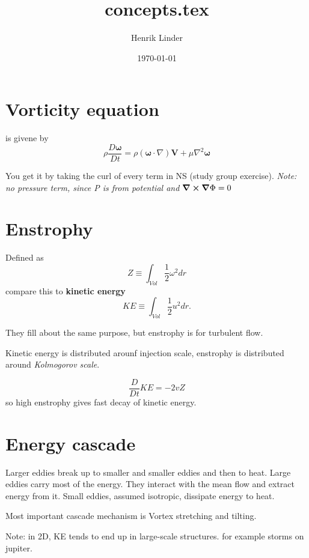 \documentclass{article}
\title{concepts.tex }
\author{Henrik Linder}
\date{\today}
\let\vec\mathbf
\begin{document}
\maketitle
\section{Vorticity equation}
is givene by 
\begin{equation}
	\rho \frac{D\vec \omega}{Dt} = \rho(\vec\omega \cdot \nabla)\vec V + \mu \nabla ^{2}\vec \omega
\end{equation}

You get it by taking the curl of every term in NS (study group exercise). \textit{Note: no pressure term, since P is from potential and $\curl\grad \Phi = 0$}




\section{Enstrophy}
Defined as  
\begin{equation}
	Z\equiv \int_{Vol}\frac{1}{2}\omega^{2}dr
\end{equation}
compare this to 
\textbf{kinetic energy}
\begin{equation}
	KE \equiv \int_{Vol}\frac{1}{2}u^{2}dr.
\end{equation}

They fill about the same purpose, but enstrophy is for turbulent flow. 

Kinetic energy is distributed arounf injection scale, enstrophy is distributed around \textit{Kolmogorov scale}.

\begin{equation}
	\frac{D}{Dt}KE = -2vZ
\end{equation}
so high enstrophy gives fast decay of kinetic energy. 


\section{Energy cascade}
Larger eddies break up to smaller and smaller eddies and then to heat. Large eddies carry most of the energy. They interact with the mean flow and extract energy from it. Small eddies, assumed isotropic, dissipate energy to heat.

Most important cascade mechanism is Vortex stretching and tilting. 

Note: in 2D, KE tends to end up in large-scale structures. for example storms on jupiter. 
\end{document}
